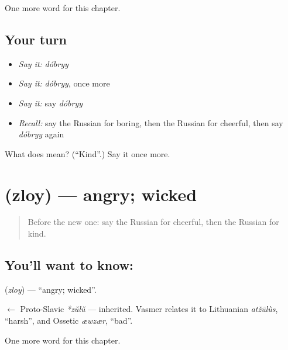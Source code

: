 \begin{grammarlens}[title={What you've built}]
One more word for this chapter.
\end{grammarlens}

\subsection*{Your turn}
\begin{itemize}
\raggedright
  \item \emph{Say it:} \emph{dóbryy}
  \item \emph{Say it:} \emph{dóbryy}, once more
  \item \emph{Say it:} say \emph{dóbryy}
  \item \emph{Recall:} say the Russian for boring, then the Russian for cheerful, then say \emph{dóbryy} again
\end{itemize}

\begin{tcolorbox}[breakable,colback=teal!4,colframe=teal!35!black,title={Before you move on}]
What does  mean? (\textquotedblleft{}Kind\textquotedblright{}.) Say it once more.
\end{tcolorbox}
\section[\texorpdfstring{\ru{злой} (zloy)}{злой (zloy)}]{ (zloy) — angry; wicked}

\label{lesson:RU-C127-angry}



\begin{quote}
Before the new one: say the Russian for cheerful, then the Russian for kind.
\end{quote}

\subsection*{You'll want to know: }
\textbf{} (\emph{zloy}) — \textquotedblleft{}angry; wicked\textquotedblright{}.

\begin{cousinweb}
\textbf{} $\leftarrow$ Proto-Slavic \emph{*zŭlŭ} — inherited. Vasmer relates it to Lithuanian \emph{atžūlùs}, \textquotedblleft{}harsh\textquotedblright{}, and Ossetic \emph{æwzær}, \textquotedblleft{}bad\textquotedblright{}.
\end{cousinweb}

\begin{grammarlens}[title={What you've built}]
One more word for this chapter.
\end{grammarlens}


